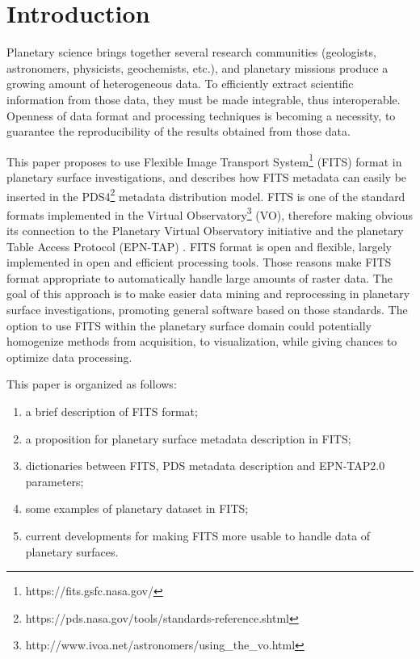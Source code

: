 \section{Introduction}
\label{sec:intro}
Planetary science brings together several research communities
(geologists, astronomers, physicists, geochemists, etc.),
and planetary missions produce a growing amount of heterogeneous data.
To efficiently extract scientific information from those data, they must
be made integrable, thus interoperable.
Openness of data format and processing techniques is becoming a necessity,
to guarantee the reproducibility of the results obtained from those data.

This paper proposes to use Flexible Image Transport
System\footnote{https://fits.gsfc.nasa.gov/}
(FITS) format \citep{fitsorig,fitsver3} in planetary surface investigations,
and describes how FITS metadata can easily be inserted in the
PDS4\footnote{https://pds.nasa.gov/tools/standards-reference.shtml}
metadata distribution model.
FITS is one of the standard formats implemented in the Virtual
Observatory\footnote{http://www.ivoa.net/astronomers/using\_the\_vo.html}
(VO), therefore making obvious its connection to the Planetary Virtual
Observatory initiative and the planetary Table Access Protocol (EPN-TAP)
\citep{ERARDepntap}.
FITS format is open and flexible, largely implemented in open and efficient
processing tools.
Those reasons make FITS format appropriate to automatically handle large amounts of raster data.
The goal of this approach is to make easier data mining and reprocessing
in planetary surface investigations, promoting general software based on those
standards.
The option to use FITS within the planetary surface domain could potentially
homogenize methods from acquisition, to visualization, while
giving chances to optimize data processing.

This paper is organized as follows:
\begin{enumerate}
\item{a brief description of FITS format;}
\item{a proposition for planetary surface metadata description in FITS;}
\item{dictionaries between FITS, PDS metadata description and EPN-TAP2.0
parameters;}
\item{some examples of planetary dataset in FITS;}
\item{current developments for making FITS more usable to handle data
of planetary surfaces.}
\end{enumerate}

